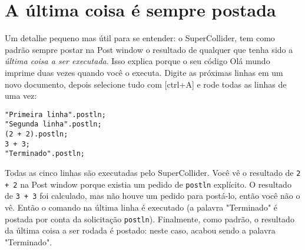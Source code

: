 \section{A última coisa é sempre postada}

Um detalhe pequeno mas útil para se entender: o SuperCollider, tem como padrão sempre postar na Post window o resultado de qualquer que tenha sido a \emph{última coisa a ser executada}. Isso explica porque o seu código Olá mundo imprime duas vezes quando você o executa. Digite as próximas linhas em um novo documento, depois selecione tudo com [ctrl+A] e rode todas as linhas de uma vez:

\begin{lstlisting}[style=SuperCollider-IDE, basicstyle=\scttfamily\footnotesize]
"Primeira linha".postln;
"Segunda linha".postln;
(2 + 2).postln;
3 + 3;
"Terminado".postln;
\end{lstlisting}

Todas as cinco linhas são executadas pelo SuperCollider. Você vê o resultado de \texttt{2 + 2} na Post window porque existia um pedido de \texttt{postln} explícito. O resultado de \texttt{3 + 3} foi calculado, mas não houve um pedido para postá-lo, então você não o vê. Então o comando na última linha é executado (a palavra "Terminado" é postada por conta da solicitação \texttt{postln}). Finalmente, como padrão, o resultado da última coisa a ser rodada é postado: neste caso, acabou sendo a palavra "Terminado".
